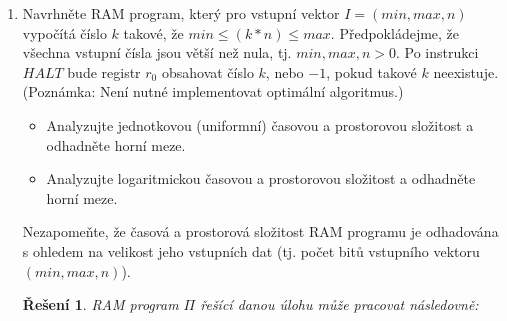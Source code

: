 \documentclass[a4paper]{article}
\let\var\mathit
\theoremstyle{result}
\newtheorem*{result}{Řešení}
\begin{document}
\begin{enumerate}
    

    \item Navrhněte RAM program, který pro vstupní vektor $I = (\var{min}, \var{max}, n)$ vypočítá číslo $k$ takové, že $\var{min} \le (k*n) \le \var{max}$. Předpokládejme, že všechna vstupní čísla jsou větší než nula, tj. $\var{min}, \var{max}, n > 0$. Po instrukci $\var{HALT}$ bude registr $r_0$ obsahovat číslo $k$, nebo $-1$, pokud takové $k$ neexistuje. (Poznámka: Není nutné implementovat optimální algoritmus.)

    \begin{itemize}
        \item Analyzujte jednotkovou (uniformní) časovou a prostorovou složitost a odhadněte horní meze.
        \item Analyzujte logaritmickou časovou a prostorovou složitost a odhadněte horní meze.
    \end{itemize}

    Nezapomeňte, že časová a prostorová složitost RAM programu je odhadována s ohledem na velikost jeho vstupních dat (tj. počet bitů vstupního vektoru $(\var{min}, \var{max}, n)$).

    \begin{result}
        RAM program $\Pi$ řešící danou úlohu může pracovat následovně:


\end{result}
\end{enumerate}
\end{document}
